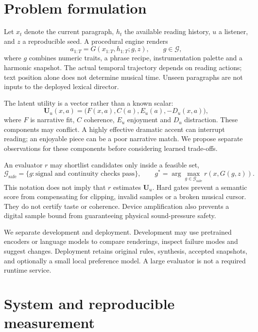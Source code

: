 \documentclass[11pt]{article}
\begin{document}
\section{Problem formulation}
Let $x_t$ denote the current paragraph, $h_t$ the available reading history, $u$ a listener, and $z$ a reproducible seed. A procedural engine renders
\begin{equation}
 a_{1:T}=G(x_{1:T},h_{1:T};g,z),\qquad g\in\mathcal G,
\end{equation}
where $g$ combines numeric traits, a phrase recipe, instrumentation palette and a harmonic snapshot. The actual temporal trajectory depends on reading actions; text position alone does not determine musical time. Unseen paragraphs are not inputs to the deployed lexical director.

The latent utility is a vector rather than a known scalar:
\begin{equation}
 \mathbf U_u(x,a)=\big(F(x,a),C(a),E_u(a),-D_u(x,a)\big),
\end{equation}
where $F$ is narrative fit, $C$ coherence, $E_u$ enjoyment and $D_u$ distraction. These components may conflict. A highly effective dramatic accent can interrupt reading; an enjoyable piece can be a poor narrative match. We propose separate observations for these components before considering learned trade-offs.

An evaluator $r$ may shortlist candidates only inside a feasible set,
\begin{equation}
 \mathcal G_{\mathrm{safe}}=\{g:\text{signal and continuity checks pass}\},
 \qquad g^*=\arg\max_{g\in\mathcal G_{\mathrm{safe}}}r(x,G(g,z)).
\end{equation}
This notation does not imply that $r$ estimates $\mathbf U_u$. Hard gates prevent a semantic score from compensating for clipping, invalid samples or a broken musical cursor. They do not certify taste or coherence. Device amplification also prevents a digital sample bound from guaranteeing physical sound-pressure safety.

We separate development and deployment. Development may use pretrained encoders or language models to compare renderings, inspect failure modes and suggest changes. Deployment retains original rules, synthesis, accepted snapshots, and optionally a small local preference model. A large evaluator is not a required runtime service.

\section{System and reproducible measurement}
\end{document}
